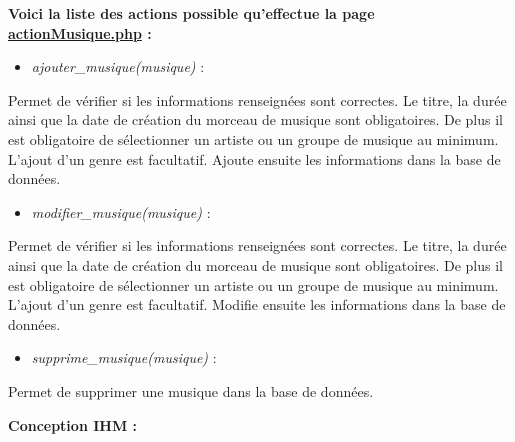             \begin{paragraphe}
                \textbf{Voici la liste des actions possible qu'effectue la page \underline{actionMusique.php} :}
            
                \begin{itemize}
                    \item \emph{ajouter\_musique(musique)} :
                \end{itemize}
                \begin{paragraphe}
                    Permet de vérifier si les informations renseignées sont correctes.
                    Le titre, la durée ainsi que la date de création du morceau de musique sont obligatoires.
                    De plus il est obligatoire de sélectionner un artiste ou un groupe de musique au minimum. L'ajout d'un genre est facultatif.
                    Ajoute ensuite les informations dans la base de données.
                \end{paragraphe}
                
                \begin{itemize}
                    \item \emph{modifier\_musique(musique)} :
                \end{itemize}
                \begin{paragraphe}
                    Permet de vérifier si les informations renseignées sont correctes.
                    Le titre, la durée ainsi que la date de création du morceau de musique sont obligatoires.
                    De plus il est obligatoire de sélectionner un artiste ou un groupe de musique au minimum. L'ajout d'un genre est facultatif.
                    Modifie ensuite les informations dans la base de données.
                \end{paragraphe}
                
                \begin{itemize}
                    \item \emph{supprime\_musique(musique)} :
                \end{itemize}
                \begin{paragraphe}
                    Permet de supprimer une musique dans la base de données.
                \end{paragraphe}
            \end{paragraphe}

			\begin{paragraphe}
				\textbf{Conception IHM :}
			\end{paragraphe}
            
